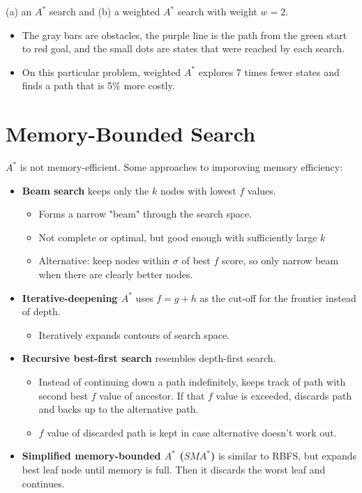 \documentclass[11pt]{article}
\begin{document}
(a) an \(A^*\) search and (b) a weighted \(A^*\) search with weight \(w = 2\).

\begin{itemize}
\item The gray bars are obstacles, the purple line is the path from the green start to red goal, and the small dots are states that were reached by each search.
\item On this particular problem, weighted \(A^*\) explores 7 times fewer states and finds a path that is 5\% more costly.
\end{itemize}
\section{Memory-Bounded Search}
\label{sec:org1dd3360}

\(A^*\) is not memory-efficient.  Some approaches to imporoving memory efficiency:

\begin{itemize}
\item \textbf{Beam search}  keeps only the \(k\) nodes with lowest \(f\) values.

\begin{itemize}
\item Forms a narrow "beam" through the search space.
\item Not complete or optimal, but good enough with sufficiently large \(k\)
\item Alternative: keep nodes within \(\sigma\) of best \(f\) score, so only narrow beam when there are clearly better nodes.
\end{itemize}

\item \textbf{Iterative-deepening \(A^*\)} uses \(f = g + h\) as the cut-off for the frontier instead of depth.

\begin{itemize}
\item Iteratively expands contours of search space.
\end{itemize}

\item \textbf{Recursive best-first search} resembles depth-first search.

\begin{itemize}
\item Instead of continuing down a path indefinitely, keeps track of path with second best \(f\) value of ancestor.  If that \(f\) value is exceeded, discards path and backs up to the alternative path.
\item \(f\) value of discarded path is kept in case alternative doesn't work out.
\end{itemize}

\item \textbf{Simplified memory-bounded \(A^*\) (\(SMA^*\))} is similar to RBFS, but expands best leaf node until memory is full.  Then it discards the worst leaf and continues.
\end{itemize}
\end{document}
